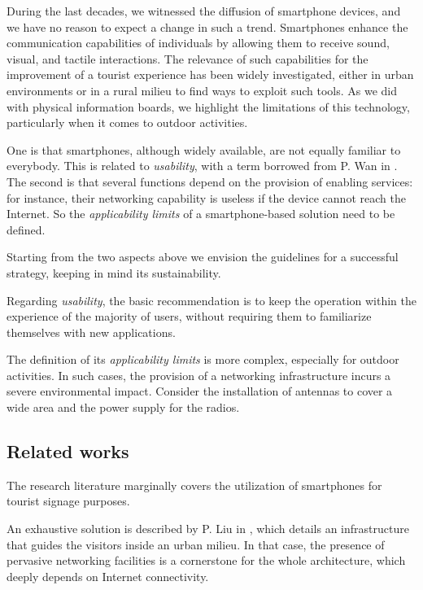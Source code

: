 \documentclass[sustainability,article,submit,pdftex,moreauthors]{Definitions/mdpi}
\begin{document}
During the last decades, we witnessed the diffusion of smartphone devices, and we have no reason to expect a change in such a trend. Smartphones enhance the communication capabilities of individuals by allowing them to receive sound, visual, and tactile interactions. The relevance of such capabilities for the improvement of a tourist experience has been widely investigated, either in urban environments \cite{liu16a} or in a rural milieu \cite{kum20a} to find ways to exploit such tools. As we did with physical information boards, we highlight the limitations of this technology, particularly when it comes to outdoor activities.

One is that smartphones, although widely available, are not equally familiar to everybody. This is related to {\em usability}, with a term borrowed from P. Wan in \cite{wan22a}. The second is that several functions depend on the provision of enabling services: for instance, their networking capability is useless if the device cannot reach the Internet. So the {\em applicability limits} of a smartphone-based solution need to be defined.

Starting from the two aspects above we envision the guidelines for a successful strategy, keeping in mind its sustainability.

Regarding \textit{usability}, the basic recommendation is to keep the operation within the experience of the majority of users, without requiring them to familiarize themselves with new applications.

The definition of its {\em applicability limits} is more complex, especially for outdoor activities. In such cases, the provision of a networking infrastructure incurs a severe environmental impact. Consider the installation of antennas to cover a wide area and the power supply for the radios. 


\subsection{Related works}

The research literature marginally covers the utilization of smartphones for tourist signage purposes.

An exhaustive solution is described by P. Liu in \cite{liu16a}, which details an infrastructure that guides the visitors inside an urban milieu. In that case, the presence of pervasive networking facilities is a cornerstone for the whole architecture, which deeply depends on Internet connectivity. 
\end{document}
